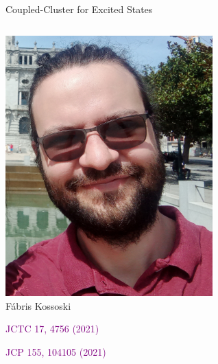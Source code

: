 \documentclass[aspectratio=169,9pt]{beamer}
\newcommand{\pub}[1]{{\small \textcolor{purple}{#1}}}
\begin{document}
\begin{frame}{Coupled-Cluster for Excited States}

                \begin{columns}
                \begin{column}{0.25\textwidth}
			\centering
\includegraphics[width=0.6\textwidth]{fig/Fabris_2021.png}
\\
Fábris Kossoski
\bigskip

		\pub{JCTC 17, 4756 (2021)}
		\bigskip

		\pub{JCP 155, 104105 (2021)}

                \end{column}


\end{columns}
\end{frame}
\end{document}
